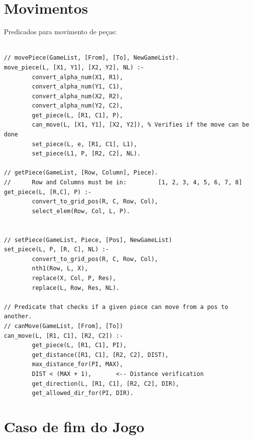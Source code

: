 \newpage

\section{Movimentos}

Predicados para movimento de peças:

\begin{lstlisting}

// movePiece(GameList, [From], [To], NewGameList).
move_piece(L, [X1, Y1], [X2, Y2], NL) :-
        convert_alpha_num(X1, R1),
        convert_alpha_num(Y1, C1),
        convert_alpha_num(X2, R2),
        convert_alpha_num(Y2, C2),
        get_piece(L, [R1, C1], P),
        can_move(L, [X1, Y1], [X2, Y2]), % Verifies if the move can be done
        set_piece(L, e, [R1, C1], L1),
        set_piece(L1, P, [R2, C2], NL).

// getPiece(GameList, [Row, Column], Piece).
//      Row and Columns must be in:         [1, 2, 3, 4, 5, 6, 7, 8]
get_piece(L, [R,C], P) :-
        convert_to_grid_pos(R, C, Row, Col),
        select_elem(Row, Col, L, P).


// setPiece(GameList, Piece, [Pos], NewGameList)
set_piece(L, P, [R, C], NL) :-
        convert_to_grid_pos(R, C, Row, Col),
        nth1(Row, L, X),
        replace(X, Col, P, Res),
        replace(L, Row, Res, NL).

// Predicate that checks if a given piece can move from a pos to another.
// canMove(GameList, [From], [To])
can_move(L, [R1, C1], [R2, C2]) :-
        get_piece(L, [R1, C1], PI),
        get_distance([R1, C1], [R2, C2], DIST),
        max_distance_for(PI, MAX),
        DIST < (MAX + 1),       <-- Distance verification
        get_direction(L, [R1, C1], [R2, C2], DIR),
        get_allowed_dir_for(PI, DIR).

\end{lstlisting}

\section{Caso de fim do Jogo}

